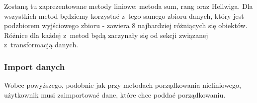 \documentclass[12pt,a4paper]{report}
\begin{document}
{Zostaną tu zaprezentowane metody liniowe: metoda sum, rang oraz Hellwiga. Dla wszystkich metod będziemy korzystać z~tego samego zbioru danych, który jest podzbiorem wyjściowego zbioru - zawiera 8 najbardziej różniących się obiektów. Różnice dla każdej z~metod będą zaczynały się od sekcji związanej z~transformacją danych. 

\subsubsection{Import danych}
Wobec powyższego, podobnie jak przy metodach porządkowania nieliniowego, użytkownik musi zaimportować dane, które chce poddać porządkowaniu. 


\begin{Shaded}
\begin{Highlighting}[]
\StringTok{ }\NormalTok{(}\NormalTok{, }
                            \NormalTok{, } \NormalTok{(}\NormalTok{,}\NormalTok{, }
                           \NormalTok{, }\NormalTok{, }\NormalTok{, }\NormalTok{,                                                                              }\NormalTok{,}\NormalTok{, }\NormalTok{, }\NormalTok{, }
                              \NormalTok{, }\NormalTok{, }\NormalTok{,  }\NormalTok{, }
                              \NormalTok{, }\NormalTok{, }\NormalTok{, }\NormalTok{,}\NormalTok{, }
                                  \NormalTok{, }\NormalTok{, }\NormalTok{, }\NormalTok{, }
                                   \NormalTok{, }\NormalTok{, }\NormalTok{,                                                                              }\NormalTok{, }
                                   \NormalTok{, }\NormalTok{, }\NormalTok{))}
\end{Highlighting}
\end{Shaded}



}
\end{document}
